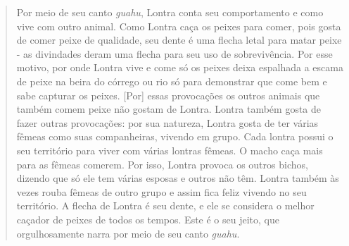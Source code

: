 \begin{quote}
Por meio de seu canto \emph{guahu}, Lontra conta seu comportamento e
como vive com outro animal. Como Lontra caça os peixes para comer, pois
gosta de comer peixe de qualidade, seu dente é uma flecha letal para
matar peixe - as divindades deram uma flecha para seu uso de
sobrevivência. Por esse motivo, por onde Lontra vive e come só os peixes
deixa espalhada a escama de peixe na beira do córrego ou rio só para
demonstrar que come bem e sabe capturar os peixes. {[}Por{]} essas
provocações os outros animais que também comem peixe não gostam de
Lontra. Lontra também gosta de fazer outras provocações: por sua
natureza, Lontra gosta de ter várias fêmeas como suas companheiras,
vivendo em grupo. Cada lontra possui o seu território para viver com
várias lontras fêmeas. O macho caça mais para as fêmeas comerem. Por
isso, Lontra provoca os outros bichos, dizendo que só ele tem várias
esposas e outros não têm. Lontra também às vezes rouba fêmeas de outro
grupo e assim fica feliz vivendo no seu território. A flecha de Lontra é
seu dente, e ele se considera o melhor caçador de peixes de todos os
tempos. Este é o seu jeito, que orgulhosamente narra por meio de seu
canto \emph{guahu}.
\end{quote}


